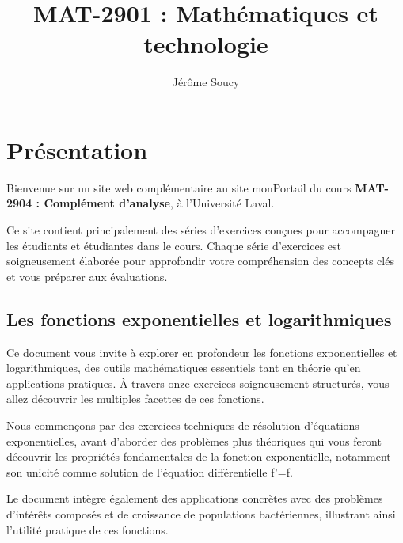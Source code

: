 \documentclass[
  12pt,
  letterpaper,
]{book}
\title{MAT-2901 : Mathématiques et technologie}
\author{Jérôme Soucy}
\date{}
\renewcommand*\contentsname{Table des matières}
\newcommand\contentsname{Table des matières}
\theoremstyle{remark}
\begin{document}
\frontmatter
\maketitle

\renewcommand*\contentsname{Table des matières}
{
\hypersetup{linkcolor=}
\setcounter{tocdepth}{2}
\tableofcontents
}
\listoffigures
\listoftables

\mainmatter
{}

\chapter*{Présentation}\label{pruxe9sentation}


Bienvenue sur un site web complémentaire au site monPortail du cours
\textbf{MAT-2904 : Complément d'analyse}, à l'Université Laval.

Ce site contient principalement des séries d'exercices conçues pour
accompagner les étudiants et étudiantes dans le cours. Chaque série
d'exercices est soigneusement élaborée pour approfondir votre
compréhension des concepts clés et vous préparer aux évaluations.

\section*{Les fonctions exponentielles et
logarithmiques}\label{les-fonctions-exponentielles-et-logarithmiques}


Ce document vous invite à explorer en profondeur les fonctions
exponentielles et logarithmiques, des outils mathématiques essentiels
tant en théorie qu'en applications pratiques. À travers onze exercices
soigneusement structurés, vous allez découvrir les multiples facettes de
ces fonctions.

Nous commençons par des exercices techniques de résolution d'équations
exponentielles, avant d'aborder des problèmes plus théoriques qui vous
feront découvrir les propriétés fondamentales de la fonction
exponentielle, notamment son unicité comme solution de l'équation
différentielle f'=f.

Le document intègre également des applications concrètes avec des
problèmes d'intérêts composés et de croissance de populations
bactériennes, illustrant ainsi l'utilité pratique de ces fonctions.
\end{document}
